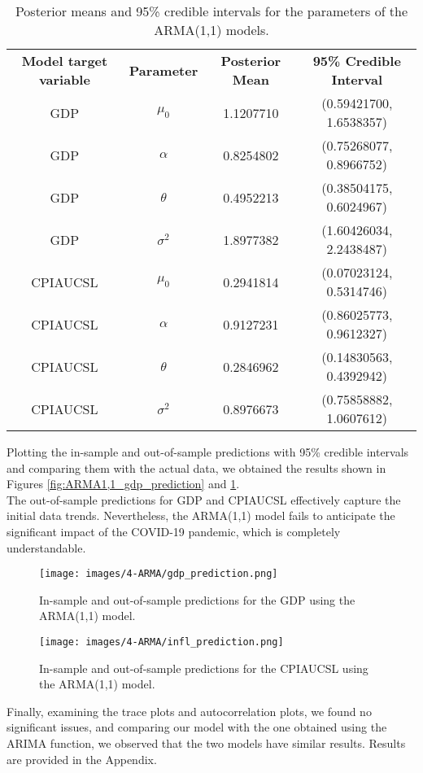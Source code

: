 \begin{table}[H]
    \centering
    \begin{tabular}{c|c|c|c}
        \textbf{Model target variable } & \textbf{Parameter } & \textbf{Posterior Mean } & \textbf{95\% Credible Interval } \\
        \cline{1-4}
        GDP      & $\mu_0$    & 1.1207710 & (0.59421700, 1.6538357) \\
        GDP      & $\alpha$   & 0.8254802 & (0.75268077, 0.8966752) \\
        GDP      & $\theta$   & 0.4952213 & (0.38504175, 0.6024967) \\
        GDP      & $\sigma^2$ & 1.8977382 & (1.60426034, 2.2438487) \\
        CPIAUCSL & $\mu_0$    & 0.2941814 & (0.07023124, 0.5314746) \\
        CPIAUCSL & $\alpha$   & 0.9127231 & (0.86025773, 0.9612327) \\
        CPIAUCSL & $\theta$   & 0.2846962 & (0.14830563, 0.4392942) \\
        CPIAUCSL & $\sigma^2$ & 0.8976673 & (0.75858882, 1.0607612) \\
    \end{tabular}
    \caption{Posterior means and 95\% credible intervals for the parameters of the ARMA(1,1) models.}
    \label{tab:ARMA1,1_posteriors}
\end{table}
Plotting the in-sample and out-of-sample predictions with 95\% credible intervals and comparing them with the actual data, we obtained the results shown in Figures \ref{fig:ARMA1,1_gdp_prediction} and \ref{fig:ARMA1,1_infl_prediction}. \\
The out-of-sample predictions for GDP and CPIAUCSL effectively capture the initial data trends. Nevertheless, the ARMA(1,1) model fails to anticipate the significant impact of the COVID-19 pandemic, which is completely understandable.
\begin{figure}[H]
    \centering
    \begin{minipage}{0.5\textwidth}
        \centering
        \texttt{[image: images/4-ARMA/gdp\_prediction.png]}
        \caption{In-sample and out-of-sample predictions for the GDP using the ARMA(1,1) model.}
        \label{fig:ARMA1,1_gdp_prediction}
    \end{minipage}\hfill
    \begin{minipage}{0.5\textwidth}
        \centering
        \texttt{[image: images/4-ARMA/infl\_prediction.png]}
        \caption{In-sample and out-of-sample predictions for the CPIAUCSL using the ARMA(1,1) model.}
        \label{fig:ARMA1,1_infl_prediction}
    \end{minipage}
\end{figure}
Finally, examining the trace plots and autocorrelation plots, we found no significant issues, and comparing our model with the one obtained using the ARIMA function, we observed that the two models have similar results. Results are provided in the Appendix.